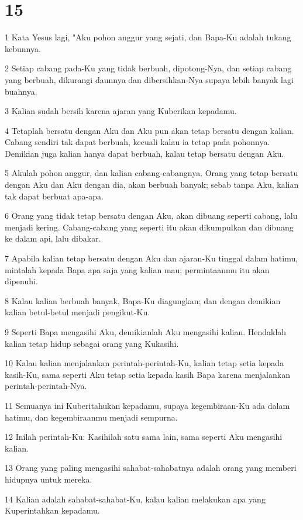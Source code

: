 \chapter{15}

\par 1 Kata Yesus lagi, "Aku pohon anggur yang sejati, dan Bapa-Ku adalah tukang kebunnya.
\par 2 Setiap cabang pada-Ku yang tidak berbuah, dipotong-Nya, dan setiap cabang yang berbuah, dikurangi daunnya dan dibersihkan-Nya supaya lebih banyak lagi buahnya.
\par 3 Kalian sudah bersih karena ajaran yang Kuberikan kepadamu.
\par 4 Tetaplah bersatu dengan Aku dan Aku pun akan tetap bersatu dengan kalian. Cabang sendiri tak dapat berbuah, kecuali kalau ia tetap pada pohonnya. Demikian juga kalian hanya dapat berbuah, kalau tetap bersatu dengan Aku.
\par 5 Akulah pohon anggur, dan kalian cabang-cabangnya. Orang yang tetap bersatu dengan Aku dan Aku dengan dia, akan berbuah banyak; sebab tanpa Aku, kalian tak dapat berbuat apa-apa.
\par 6 Orang yang tidak tetap bersatu dengan Aku, akan dibuang seperti cabang, lalu menjadi kering. Cabang-cabang yang seperti itu akan dikumpulkan dan dibuang ke dalam api, lalu dibakar.
\par 7 Apabila kalian tetap bersatu dengan Aku dan ajaran-Ku tinggal dalam hatimu, mintalah kepada Bapa apa saja yang kalian mau; permintaanmu itu akan dipenuhi.
\par 8 Kalau kalian berbuah banyak, Bapa-Ku diagungkan; dan dengan demikian kalian betul-betul menjadi pengikut-Ku.
\par 9 Seperti Bapa mengasihi Aku, demikianlah Aku mengasihi kalian. Hendaklah kalian tetap hidup sebagai orang yang Kukasihi.
\par 10 Kalau kalian menjalankan perintah-perintah-Ku, kalian tetap setia kepada kasih-Ku, sama seperti Aku tetap setia kepada kasih Bapa karena menjalankan perintah-perintah-Nya.
\par 11 Semuanya ini Kuberitahukan kepadamu, supaya kegembiraan-Ku ada dalam hatimu, dan kegembiraanmu menjadi sempurna.
\par 12 Inilah perintah-Ku: Kasihilah satu sama lain, sama seperti Aku mengasihi kalian.
\par 13 Orang yang paling mengasihi sahabat-sahabatnya adalah orang yang memberi hidupnya untuk mereka.
\par 14 Kalian adalah sahabat-sahabat-Ku, kalau kalian melakukan apa yang Kuperintahkan kepadamu.
